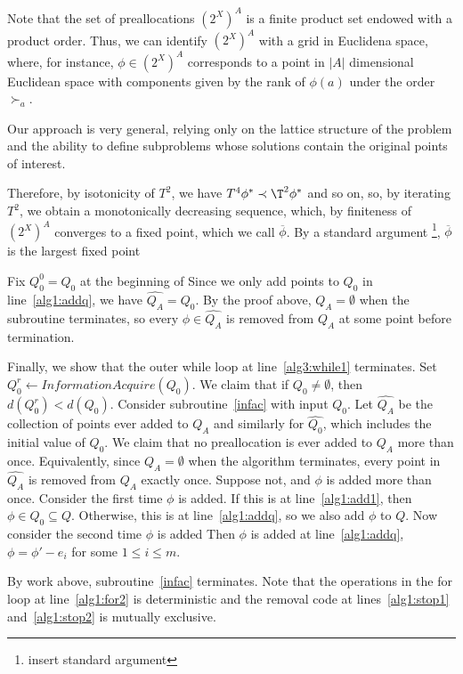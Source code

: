 \documentclass[11pt,reqno]{amsart}
\theoremstyle{definition}
\numberwithin{equation}{section}
\newcommand{\wh}{\widehat}
\newcommand{\ol}{\overline}
\newcommand{\pre}{\phi}
\newcommand{\prealloc}{(2^X)^A}
\newcommand{\sub}{\subseteq}
\newcommand{\su}{\succ}
\newcommand{\pe}{\prec}
\newcommand{\toppre}{\ol{\pre}}
\newcommand{\acto}{Q_0}
\newcommand{\acta}{Q_A}
\newcommand{\act}{Q}
\newcommand{\actacum}{\wh{Q_A}}
\newcommand{\actocum}{\wh{Q_0}}
\begin{document}
\begin{enumerate}
Note that the set of preallocations $\prealloc$ is a finite product set endowed with a product order.
Thus, we can identify $\prealloc$ with a grid in Euclidena space, where, for instance, $\pre \in \prealloc$ corresponds to a point in $|A|$ dimensional Euclidean space with components given by the rank of $\pre(a)$ under the order $\su_a$. 

Our approach is very general, relying only on the lattice structure of the problem and the ability to define subproblems whose solutions contain the original points of interest.  

Therefore, by isotonicity of $T^2$, we have $T^4 \pre^* \pe \T^2 \pre^*$ and so on, so, by iterating $T^2$, we obtain a monotonically decreasing sequence, which, by finiteness of $\prealloc$ converges to a fixed point, which we call $\toppre$.
By a standard argument \footnote{insert standard argument}, $\toppre$ is the largest fixed point 

Fix $\acto^{0} = \acto$ at the beginning of 
Since we only add points to $\acto$ in line~\ref{alg1:addq}, we have $\actacum = \actocum$. 
By the proof above, $\acta = \emptyset$ when the subroutine terminates, so every $\pre \in \actacum$ is removed from $\acta$ at some point before termination.



Finally, we show that the outer while loop at line~\ref{alg3:while1} terminates.
Set $\acto^r \leftarrow InformationAcquire(\acto)$. 
We claim that if $\acto \not = \emptyset$, then $d(\acto^r) < d(\acto)$. 
Consider subroutine~\ref{infac} with input $\acto$. 
Let $\actacum$ be the collection of points ever added to $\acta$ and similarly for $\actocum$, which includes the initial value of $\acto$. 
We claim that no preallocation is ever added to $\acta$ more than once. 
Equivalently, since $\acta = \emptyset$ when the algorithm terminates, every point in $\actacum$ is removed from $\acta$ exactly once. 
Suppose not, and $\pre$ is added more than once. 
Consider the first time $\pre$ is added. 
If this is at line~\ref{alg1:add1}, then $\pre \in \acto \sub \act$.
Otherwise, this is at line~\ref{alg1:addq}, so we also add $\pre$ to $\act$.
Now consider the second time $\pre$ is added 
Then $\pre$ is added at line~\ref{alg1:addq}, $\pre = \pre' - e_i$ for some $1 \leq i \leq m$.


By work above, subroutine~\ref{infac} terminates.
Note that the operations in the for loop at line~\ref{alg1:for2} is deterministic and the removal code at lines~\ref{alg1:stop1} and~\ref{alg1:stop2} is mutually exclusive. 


\end{enumerate}
\end{document}
